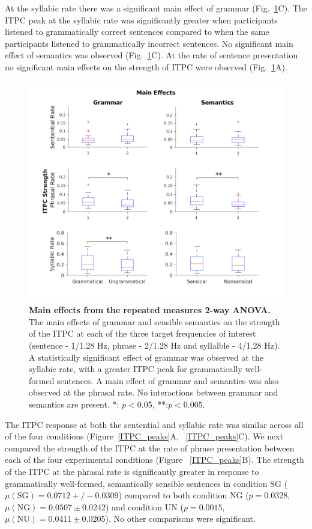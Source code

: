 \documentclass[a4paper,10pt,twoside]{article}
\begin{document}
{At the syllabic rate there was a significant main effect of grammar
(Fig.~\ref{MainEffects}C). The ITPC peak at the syllabic rate was
significantly greater when participants listened to grammatically
correct sentences compared to when the same participants listened to
grammatically incorrect sentences. No significant main
effect of semantics was observed (Fig.~\ref{MainEffects}C). At the
rate of sentence presentation no significant main effects on the
strength of ITPC were observed (Fig.~\ref{MainEffects}A).

\begin{figure}[tbp]
\includegraphics[width=\linewidth]{BoxPlots_main_effects.png}
\caption{\textbf{Main effects from the repeated measures 2-way ANOVA.}
  The main effects of grammar and sensible semantics on the strength
  of the ITPC at each of the three target frequencies of interest
  (sentence - 1/1.28 Hz, phrase - 2/1.28 Hz and syllalble - 4/1.28
  Hz). A statistically significant effect of grammar was observed at
  the syllabic rate, with a greater ITPC peak for grammatically
  well-formed sentences.  A main effect of grammar and semantics was
  also observed at the phrasal rate. No interactions between grammar
  and semantics are present.  *: $p<0.05$, **:$p<0.005$.  }
\label{MainEffects}
\end{figure}

The ITPC response at both the sentential and syllabic rate was similar
across all of the four conditions (Figure~\ref{ITPC_peaks}A,
~\ref{ITPC_peaks}C). We next compared the strength of the ITPC at the
rate of phrase presentation between each of the four experimental
conditions (Figure ~\ref{ITPC_peaks}B). The strength of the ITPC at
the phrasal rate is significantly greater in response to grammatically
well-formed, semantically sensible sentences in condition SG
($\mu(\mathrm{SG}) = 0.0712 +/- 0.0309$) compared to both condition NG
($p = 0.0328$, $\mu(\mathrm{NG}) = 0.0507 \pm 0.0242$) and condition
UN ($p = 0.0015$, $\mu(\mathrm{NU}) = 0.0411 \pm 0.0205$). No other
comparisons were significant.

}
\end{document}

